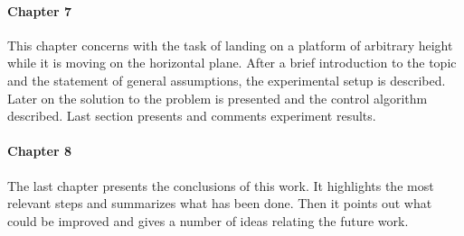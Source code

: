 \paragraph{Chapter 7}

This chapter concerns with the task of landing on a platform of arbitrary height while it is moving on the horizontal plane. After a brief introduction to the topic and the statement of general assumptions, the experimental setup is described. Later on the solution to the problem is presented and the control algorithm described. Last section presents and comments experiment results.

\paragraph{Chapter 8}

The last chapter presents the conclusions of this work. It highlights the most relevant steps and summarizes what has been done. Then it points out what could be improved and gives a number of ideas relating the future work.










